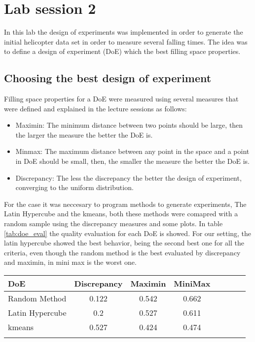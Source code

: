 \section{Lab session 2}

In this lab the design of experiments was implemented in order to generate the initial helicopter data set in order to measure several falling times. The idea was to define a design of experiment (DoE) which the best filling space properties.

\subsection{Choosing the best design of experiment}

Filling space properties for a DoE were measured using several measures that were defined and explained in the lecture sessions as follows:

\begin{itemize}
	\item Maximin: The minimum distance between two points should be large, then the larger the measure the better the DoE is.
	\item Minmax: The maximum distance between any point in the space and a point in DoE should be small, then, the smaller the measure the better the DoE is.
	\item Discrepancy: The less the discrepancy the better the design of experiment, converging to the uniform distribution.
\end{itemize}

For the case it was neccesary to program methods to generate experiments, The Latin Hypercube and the kmeans, both these methods were comapred with a random sample using the discrepancy measures and some plots. In table \ref{tab:doe_eval} the quality evaluation for each DoE is showed. For our setting, the latin hypercube showed the best behavior, being the second best one for all the criteria, even though the random method is the best evaluated by discrepancy and maximin, in mini max is the worst one.

\begin{center}
	 \label{tab:doe_eval} 
	\begin{tabular}{l*{6}{c}r}
		DoE              & Discrepancy & Maximin & MiniMax \\
		\hline
		Random Method    & 0.122 & 0.542 & 0.662 \\
		Latin Hypercube  & 0.2 & 0.527 & 0.611 \\
		kmeans           & 0.527 & 0.424 & 0.474 \\
		\label{tab_doe}
	\end{tabular}
\end{center}

